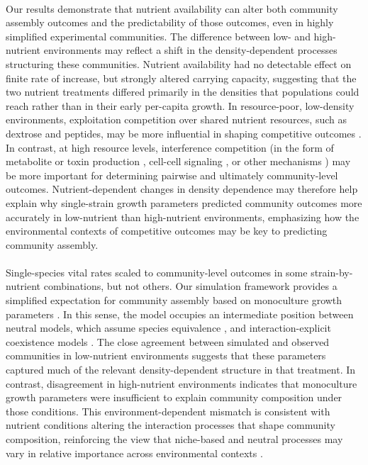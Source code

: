 \paragraph{} Our results demonstrate that nutrient availability can alter both community assembly outcomes and the predictability of those outcomes, even in highly simplified experimental communities. The difference between low- and high-nutrient environments may reflect a shift in the density-dependent processes structuring these communities. Nutrient availability had no detectable effect on finite rate of increase, but strongly altered carrying capacity, suggesting that the two nutrient treatments differed primarily in the densities that populations could reach rather than in their early per-capita growth. In resource-poor, low-density environments, exploitation competition over shared nutrient resources, such as dextrose and peptides, may be more influential in shaping competitive outcomes \parencite{hoek2016resource}. In contrast, at high resource levels, interference competition (in the form of metabolite or toxin production \parencite{greig2008density}, cell-cell signaling \parencite{honigberg2011cell}, or other mechanisms \parencite{perez2017ecological}) may be more important for determining pairwise and ultimately community-level outcomes. Nutrient-dependent changes in density dependence may therefore help explain why single-strain growth parameters predicted community outcomes more accurately in low-nutrient than high-nutrient environments, emphasizing how the environmental contexts of competitive outcomes may be key to predicting community assembly. 

\paragraph{} Single-species vital rates scaled to community-level outcomes in some strain-by-nutrient combinations, but not others. Our simulation framework provides a simplified expectation for community assembly based on monoculture growth parameters \parencite{ram2019predicting, nestor2023interactions}. In this sense, the model occupies an intermediate position between neutral models, which assume species equivalence \parencite{Hubbell2001}, and interaction-explicit coexistence models \parencite{chesson2000mechanisms, chesson2018updates}.  The close agreement between simulated and observed communities in low-nutrient environments suggests that these parameters captured much of the relevant density-dependent structure in that treatment. In contrast, disagreement in high-nutrient environments indicates that monoculture growth parameters were insufficient to explain community composition under those conditions. This environment-dependent mismatch is consistent with nutrient conditions altering the interaction processes that shape community composition, reinforcing the view that niche-based and neutral processes may vary in relative importance across environmental contexts \parencite{weiher2011advances}.  

